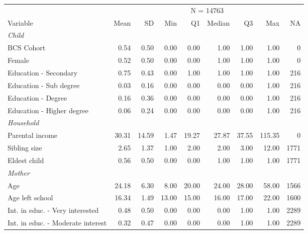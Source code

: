 
\begin{tabular}{lrrrrrrrr}
\toprule
\multicolumn{1}{c}{} & \multicolumn{8}{c}{N = 14763} \\
\cmidrule(l{3pt}r{3pt}){2-9}
Variable & Mean & SD & Min & Q1 & Median & Q3 & Max & NA\\
\midrule
\multicolumn{9}{l}{\textit{Child}}\\
\midrule
\hspace{1em}BCS Cohort & 0.54 & 0.50 & 0.00 & 0.00 & 1.00 & 1.00 & 1.00 & 0\\
\hspace{1em}Female & 0.52 & 0.50 & 0.00 & 0.00 & 1.00 & 1.00 & 1.00 & 0\\
\hspace{1em}Education - Secondary & 0.75 & 0.43 & 0.00 & 1.00 & 1.00 & 1.00 & 1.00 & 216\\
\hspace{1em}Education - Sub degree & 0.03 & 0.16 & 0.00 & 0.00 & 0.00 & 0.00 & 1.00 & 216\\
\hspace{1em}Education - Degree & 0.16 & 0.36 & 0.00 & 0.00 & 0.00 & 0.00 & 1.00 & 216\\
\hspace{1em}Education - Higher degree & 0.06 & 0.24 & 0.00 & 0.00 & 0.00 & 0.00 & 1.00 & 216\\
\midrule
\multicolumn{9}{l}{\textit{Household}}\\
\midrule
\hspace{1em}Parental income & 30.31 & 14.59 & 1.47 & 19.27 & 27.87 & 37.55 & 115.35 & 0\\
\hspace{1em}Sibling size & 2.65 & 1.37 & 1.00 & 2.00 & 2.00 & 3.00 & 12.00 & 1771\\
\hspace{1em}Eldest child & 0.56 & 0.50 & 0.00 & 0.00 & 1.00 & 1.00 & 1.00 & 1771\\
\midrule
\multicolumn{9}{l}{\textit{Mother}}\\
\midrule
\hspace{1em}Age & 24.18 & 6.30 & 8.00 & 20.00 & 24.00 & 28.00 & 58.00 & 1566\\
\hspace{1em}Age left school & 16.34 & 1.49 & 13.00 & 15.00 & 16.00 & 17.00 & 22.00 & 1600\\
\hspace{1em}Int. in educ. - Very interested & 0.48 & 0.50 & 0.00 & 0.00 & 0.00 & 1.00 & 1.00 & 2289\\
\hspace{1em}Int. in educ. - Moderate interest & 0.32 & 0.47 & 0.00 & 0.00 & 0.00 & 1.00 & 1.00 & 2289\\

\end{tabular}
